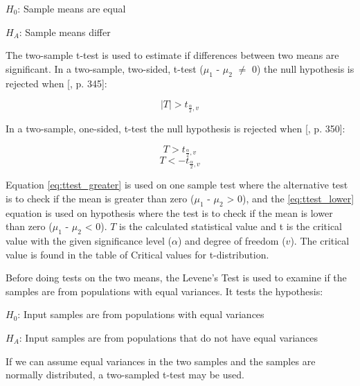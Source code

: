 \centerline{$H_{0}$: Sample means are equal} 
\centerline{$H_{A}$: Sample means differ}

The two-sample t-test is used to estimate if differences between two means are significant. In a two-sample, two-sided, t-test ($\mu_{1}$ - $\mu_{2}$ $\neq$ 0) the null hypothesis is rejected when [\citep{Walpole2012}, p. 345]:

\begin{equation}
\label{eq:ttest_twoway}
|T| > t_{\frac{\alpha}{2}, v} 
\end{equation}

In a two-sample, one-sided, t-test the null hypothesis is rejected when [\citep{Walpole2012}, p. 350]:

\begin{equation}
\label{eq:ttest_greater}
T > t_{\frac{\alpha}{2}, v}
\end{equation}
\begin{equation}
\label{eq:ttest_lower}
T < - t_{\frac{\alpha}{2}, v}
\end{equation}

Equation \ref{eq:ttest_greater} is used on one sample test where the alternative test is to check if the mean is greater than zero ($\mu_{1}$ - $\mu_{2}$ > 0), and the \ref{eq:ttest_lower} equation is used on hypothesis where the test is to check if the mean is lower than zero ($\mu_{1}$ - $\mu_{2}$ < 0). $T$ is the calculated statistical value and t is the critical value with the given significance level ($\alpha$) and degree of freedom ($v$). The critical value is found in the table of Critical values for t-distribution. \newline 
 
Before doing tests on the two means, the Levene's Test is used to examine if the samples are from populations with equal variances. It tests the hypothesis:\newline %

\centerline{$H_{0}$: Input samples are from populations with equal variances} 
\centerline{$H_{A}$: Input samples are from populations that do not have equal variances}
\vspace{0.2cm}
If we can assume equal variances in the two samples and the samples are normally distributed, a two-sampled t-test may be used. 

